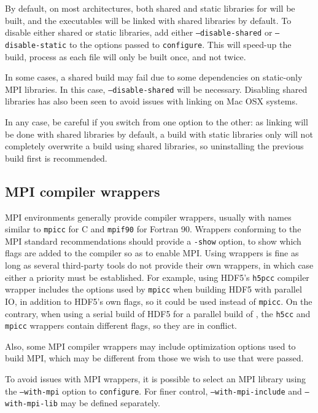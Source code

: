 \documentclass[a4paper,10pt,twoside]{article}
\begin{document}
By default, on most architectures, both shared and static libraries
for \CS will be built, and the executables will be linked with shared
libraries by default. To disable either shared or static libraries,
add either {\tt --disable-shared} or {\tt --disable-static}
to the options passed to {\tt configure}. This will speed-up the build,
process as each file will only be built once, and not twice.

In some cases, a shared build may fail due to some dependencies
on static-only MPI libraries. In this case, {\tt --disable-shared}
will be necessary. Disabling shared libraries has also been seen
to avoid issues with linking on Mac OSX systems.

In any case, be careful if you switch from one option to the other: as
linking will be done with shared libraries by default, a build
with static libraries only will not completely overwrite a build using
shared libraries, so uninstalling the previous build first
is recommended.

\subsection{MPI compiler wrappers\label{sec:config:mpicc}}

MPI environments generally provide compiler wrappers, usually
with names similar to \texttt{mpicc} for C and \texttt{mpif90} for
Fortran 90. Wrappers conforming to the MPI standard recommendations should
provide a \texttt{-show} option, to show which flags are added to the compiler
so as to enable MPI. Using wrappers is fine as long as several third-party tools
do not provide their own wrappers, in which case either
a priority must be established. For example, using HDF5's
\texttt{h5pcc} compiler wrapper includes the options used by
\texttt{mpicc} when building HDF5 with parallel IO, in addition to
HDF5's own flags, so it could be used instead of \texttt{mpicc}.
On the contrary, when using a serial build of HDF5 for a parallel
build of \CS, the \texttt{h5cc} and \texttt{mpicc} wrappers
contain different flags, so they are in conflict.

Also, some MPI compiler wrappers may include optimization options
used to build MPI, which may be different from those we wish to use
that were passed. 

To avoid issues with MPI wrappers, it is possible to select an
MPI library using the \texttt{--with-mpi} option to \texttt{configure}.
For finer control, \texttt{--with-mpi-include} and \texttt{--with-mpi-lib}
may be defined separately.
\end{document}
